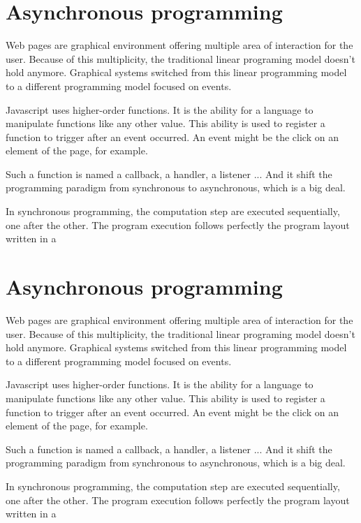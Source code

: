 \section{Asynchronous programming}

Web pages are graphical environment offering multiple area of interaction for the user.
Because of this multiplicity, the traditional linear programing model doesn't hold anymore.
Graphical systems switched from this linear programming model to a different programming model focused on events.

Javascript uses higher-order functions.
It is the ability for a language to manipulate functions like any other value.
This ability is used to register a function to trigger after an event occurred.
An event might be the click on an element of the page, for example.

Such a function is named a callback, a handler, a listener ...
And it shift the programming paradigm from synchronous to asynchronous, which is a big deal.

In synchronous programming, the computation step are executed sequentially, one after the other.
The program execution follows perfectly the program layout written in a 


\section{Asynchronous programming}

Web pages are graphical environment offering multiple area of interaction for the user.
Because of this multiplicity, the traditional linear programing model doesn't hold anymore.
Graphical systems switched from this linear programming model to a different programming model focused on events.

Javascript uses higher-order functions.
It is the ability for a language to manipulate functions like any other value.
This ability is used to register a function to trigger after an event occurred.
An event might be the click on an element of the page, for example.

Such a function is named a callback, a handler, a listener ...
And it shift the programming paradigm from synchronous to asynchronous, which is a big deal.

In synchronous programming, the computation step are executed sequentially, one after the other.
The program execution follows perfectly the program layout written in a 

